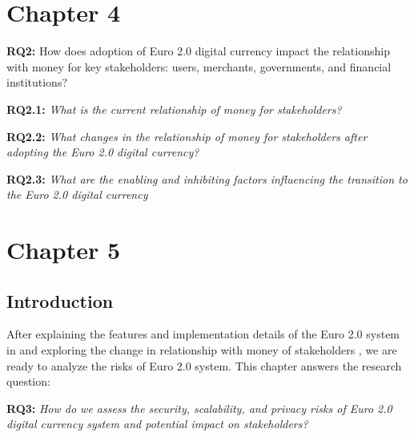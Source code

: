 \documentclass[12pt]{article} %
\newcommand{\hypernameref}[1]{\hyperref[#1]{\nameref{#1}}}
\begin{document}
{\pagebreak

\section{Chapter 4} \label{sec:4}


\begin{quoting}
	\textbf{RQ2:} How does adoption of Euro 2.0 digital currency impact the relationship with money for key stakeholders: users, merchants, governments, and financial institutions?
\end{quoting}

\begin{quoting}
	\textbf{RQ2.1: }\textit{What is the current relationship of money for stakeholders?}
\end{quoting}
\begin{quoting}
	\textbf{RQ2.2: }\textit{What changes in the relationship of money for stakeholders after adopting the Euro 2.0 digital currency?}
\end{quoting}
\begin{quoting}
	\textbf{RQ2.3: }\textit{What are the enabling and inhibiting factors influencing the transition to the Euro 2.0 digital currency}
\end{quoting}

\pagebreak

\section{Chapter 5} \label{sec:5}

\subsection{Introduction} \label{ssec:5:intro}

After explaining the features and implementation details of the Euro 2.0 system in \hypernameref{sec:3} and exploring the change in relationship with money of stakeholders \hypernameref{sec:4}, we are ready to analyze the risks of Euro 2.0 system. This chapter answers the research question:

\begin{quoting}
	\textbf{RQ3:} \textit{How do we assess the security, scalability, and privacy risks of Euro 2.0 digital currency system and potential impact on stakeholders?}
\end{quoting}

}
\end{document}
